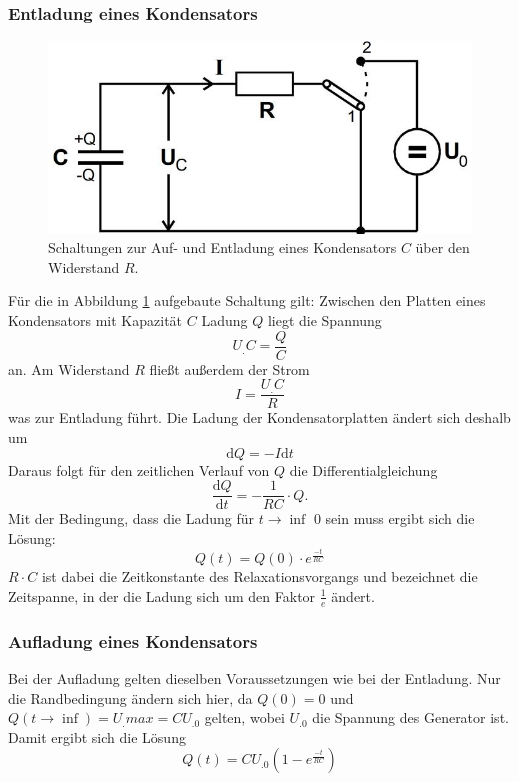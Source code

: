 \subsubsection{Entladung eines Kondensators}
\label{sec:Entladung}
\begin{figure}
\centering
\includegraphics[scale=0.4]{content/images/theorie.jpg}
\caption{Schaltungen zur Auf- und Entladung eines Kondensators $C$ über den Widerstand $R$.\cite{V353}}
\label{fig:theorie}
\end{figure}
Für die in Abbildung \ref{fig:theorie} aufgebaute Schaltung gilt:
Zwischen den Platten eines Kondensators mit Kapazität $C$ Ladung $Q$  liegt die Spannung
\begin{equation}
U_.C=\frac{Q}{C}\label{eq:QC}
\end{equation}
an. Am Widerstand $R$ fließt außerdem der Strom
\begin{equation}
I = \frac{U_.C}{R}
\end{equation}
was zur Entladung führt.
Die Ladung der Kondensatorplatten ändert sich deshalb um
\begin{equation}
\mathrm{d}Q = - I\mathrm{d}t\label{eq:dQ}
\end{equation}
Daraus folgt für den zeitlichen Verlauf von $Q$ die Differentialgleichung
\begin{equation}
\frac{\mathrm{d}Q}{\mathrm{d}t} = - \frac{1}{RC}\cdot Q\text{.}
\label{eq:DGL}
\end{equation}
Mit der Bedingung, dass die Ladung für $t\rightarrow\inf$ 0 sein muss ergibt sich die Lösung:
\begin{equation}
Q(t) = Q(0)\cdot e^{\frac{-t}{RC}} \label{eq:Q1}
\end{equation}
$R\cdot C$ ist dabei die Zeitkonstante des Relaxationsvorgangs und bezeichnet die Zeitspanne, in der die Ladung sich um den Faktor $\frac{1}{e}$ ändert.
\subsubsection{Aufladung eines Kondensators}
\label{sec:Aufladung}
Bei der Aufladung gelten dieselben Voraussetzungen wie bei der Entladung. Nur die Randbedingung ändern sich hier, da $Q(0)=0$ und $Q(t\rightarrow\inf)=U_.{max}=CU_.0$ gelten, wobei $U_.0$ die Spannung des Generator ist.
Damit ergibt sich die Lösung
\begin{equation}
Q(t) = CU_.0\left(1-e^{\frac{-t}{RC}}\right) \label{eq:Q2}
\end{equation}
